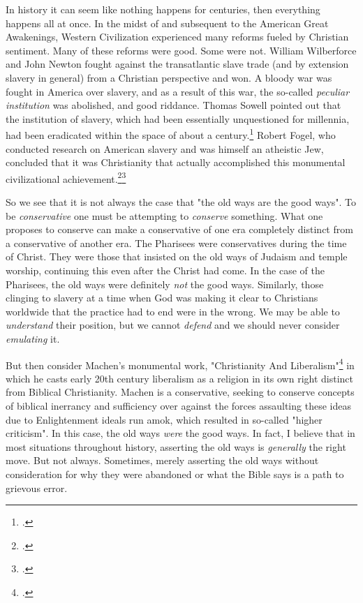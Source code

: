 In history it can seem like nothing happens for centuries, then everything happens all at once.  In the midst of and subsequent to the American Great Awakenings, Western Civilization experienced many reforms fueled by Christian sentiment.  Many of these reforms were good.  Some were not. William Wilberforce and John Newton fought against the transatlantic slave trade (and by extension slavery in general) from a Christian perspective and won.  A bloody war was fought in America over slavery, and as a result of this war, the so-called \textit{peculiar institution} was abolished, and good riddance.  Thomas Sowell pointed out that the institution of slavery, which had been essentially unquestioned for millennia, had been eradicated within the space of about a century.\footcite{sowellblack}  Robert Fogel, who conducted research on American slavery and was himself an atheistic Jew, concluded that it was Christianity that actually accomplished this monumental civilizational achievement.\footcite{carpentersecularjew}\footcite{carpenterapologist} 

So we see that it is not always the case that "the old ways are the good ways".  To be \textit{conservative} one must be attempting to \textit{conserve} something.  What one proposes to conserve can make a conservative of one era completely distinct from a conservative of another era.  The Pharisees were conservatives during the time of Christ.  They were those that insisted on the old ways of Judaism and temple worship, continuing this even after the Christ had come.  In the case of the Pharisees, the old ways were definitely \textit{not} the good ways.  Similarly, those clinging to slavery at a time when God was making it clear to Christians worldwide that the practice had to end were in the wrong.  We may be able to \textit{understand} their position, but we cannot \textit{defend} and we should never consider \textit{emulating} it.  

But then consider Machen's monumental work, "Christianity And Liberalism"\footcite{machenchristianity} in which he casts early 20th century liberalism as a religion in its own right distinct from Biblical Christianity.  Machen is a conservative, seeking to conserve concepts of biblical inerrancy and sufficiency over against the forces assaulting these ideas due to Enlightenment ideals run amok, which resulted in so-called "higher criticism".  In this case, the old ways \textit{were} the good ways.  In fact, I believe that in most situations throughout history, asserting the old ways is \textit{generally} the right move.  But not always.  Sometimes, merely asserting the old ways without consideration for why they were abandoned or what the Bible says is a path to grievous error.

